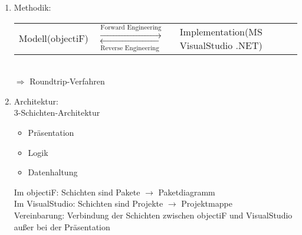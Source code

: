 \begin{enumerate}
\item Methodik:\\
\begin{tabular}{L{.3} L{.3} L{0.3}}
Modell\newline (objectiF) & $\overset{\text{Forward Engineering}}{\longrightarrow}$ \newline $\underset{\text{Reverse Engineering}}{\longleftarrow}$ & Implementation\newline (MS VisualStudio .NET)
\end{tabular}\\
$\Rightarrow$ Roundtrip-Verfahren
\item Architektur:\\
3-Schichten-Architektur
\begin{itemize}
\item Präsentation
\item Logik
\item Datenhaltung
\end{itemize}
Im objectiF: Schichten sind Pakete $\to$ Paketdiagramm\\
Im VisualStudio: Schichten sind Projekte $\to$ Projektmappe\\
Vereinbarung: Verbindung der Schichten zwischen objectiF und VisualStudio außer bei der Präsentation
\end{enumerate}














